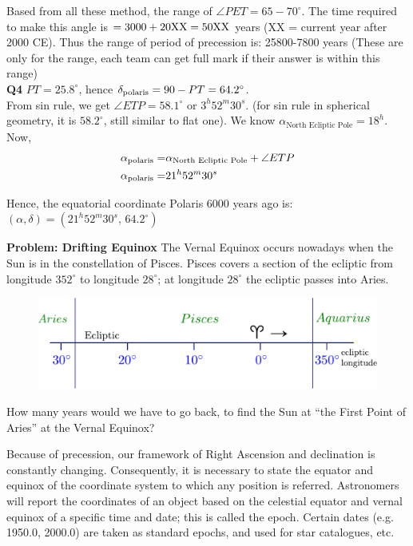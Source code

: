 \documentclass[a4paper,12pt]{extarticle}
\begin{document}
\begin{sol}
Based from all these method, the range of $\angle PET= 65 -70^\circ$.
The time required to make this angle is $\rm = 3000 +20XX= 50XX$ years (XX = current year after 2000 CE). Thus the range of period of precession is: 25800-7800 years (These are only for the range, each team can get full mark if their answer is within this range)\\

\textbf{Q4}  $PT=25.8^\circ$, hence $\delta_{\rm polaris} = 90-PT =64.2^\circ$.\\

From sin rule, we get $\angle ETP = 58.1^\circ$ or $3^h52^m30^s$. (for sin rule in spherical geometry, it is $58.2^\circ$, still similar to flat one). We know $\alpha_{\text{North Ecliptic Pole}}=18^h$. Now, 
\begin{align*}
	\alpha_{\rm polaris}=& \alpha_{\text{North Ecliptic Pole}}+ \angle ETP\\
	\alpha_{\rm polaris}=& 21^h52^m30^s
\end{align*}

Hence, the equatorial coordinate Polaris 6000 years ago is: $(\alpha, \delta)= (21^h 52^m 30^s,\, 64.2^\circ)$
\end{sol}
\begin{pro}
	\textbf{Problem: Drifting Equinox} The Vernal Equinox occurs nowadays when the Sun is in the constellation of Pisces. Pisces covers a section of the ecliptic
	from longitude $352^\circ$ to longitude $28^\circ$; at longitude $28^\circ$ the ecliptic passes into Aries.
	\begin{figure}[H]
		\centering
		\includegraphics[width=0.65\linewidth]{vernal_point.pdf}
	\end{figure}
	How many years would we have to go back, to find the Sun at ``the First Point of Aries'' at the Vernal Equinox?
\end{pro}


Because of precession, our framework of Right Ascension and declination is constantly changing. Consequently, it is necessary to state the equator and equinox of the coordinate system to which any position is referred. Astronomers will report the coordinates of an object based on the celestial equator and vernal equinox of a specific time and date; this is called the epoch. Certain dates (e.g. 1950.0, 2000.0) are taken as standard epochs, and used for star catalogues, etc.   
\clearpage 
\end{document}
